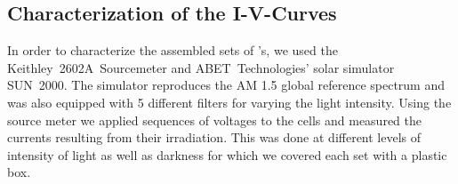 \documentclass[a4paper,10pt,twocolumn]{article}
\begin{document}
\begin{extract*}

\section{Characterization of the I-V-Curves}\label{sec:charac}

In order to characterize the assembled sets of \BHSC's, we used the Keithley~2602A~Sourcemeter and ABET~Technologies’ solar simulator SUN~2000. The simulator reproduces the AM 1.5 global reference spectrum and was also equipped with 5 different filters for varying the light intensity. Using the source meter we applied sequences of voltages to the cells and measured the currents resulting from their irradiation. This was done at different levels of intensity of light as well as darkness for which we covered each set with a plastic box.

\end{extract*}
\end{document}
